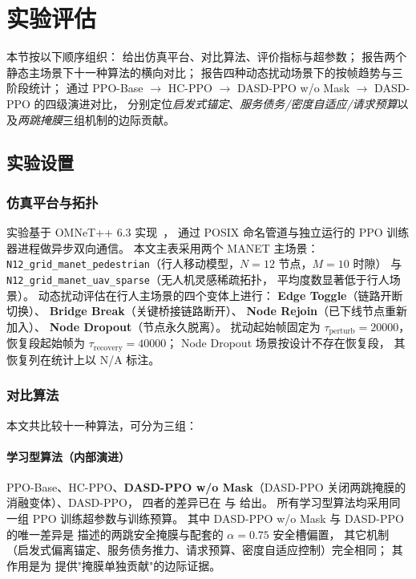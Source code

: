 \section{实验评估}
\label{sec:exp}

本节按以下顺序组织：
 给出仿真平台、对比算法、评价指标与超参数；
 报告两个静态主场景下十一种算法的横向对比；
 报告四种动态扰动场景下的按帧趋势与三阶段统计；
 通过 PPO-Base \(\rightarrow\) HC-PPO \(\rightarrow\) DASD-PPO w/o Mask \(\rightarrow\) DASD-PPO 的四级演进对比，
分别定位\emph{启发式锚定}、\emph{服务债务/密度自适应/请求预算}以及\emph{两跳掩膜}三组机制的边际贡献。

\subsection{实验设置}
\label{subsec:setup}

\subsubsection{仿真平台与拓扑}

实验基于 OMNeT++ 6.3 实现~\cite{omnetpp}，
通过 POSIX 命名管道与独立运行的 PPO 训练器进程做异步双向通信。
本文主表采用两个 MANET 主场景：
\texttt{N12\_grid\_manet\_pedestrian}（行人移动模型，\(N=12\) 节点，\(M=10\) 时隙）
与 \texttt{N12\_grid\_manet\_uav\_sparse}（无人机灵感稀疏拓扑，
平均度数显著低于行人场景）。
动态扰动评估在行人主场景的四个变体上进行：
\textbf{Edge Toggle}（链路开断切换）、
\textbf{Bridge Break}（关键桥接链路断开）、
\textbf{Node Rejoin}（已下线节点重新加入）、
\textbf{Node Dropout}（节点永久脱离）。
扰动起始帧固定为 \(\tau_{\mathrm{perturb}}=20000\)，
恢复段起始帧为 \(\tau_{\mathrm{recovery}}=40000\)；
Node Dropout 场景按设计不存在恢复段，
其恢复列在统计上以 N/A 标注。

\subsubsection{对比算法}

本文共比较十一种算法，可分为三组：

\paragraph{学习型算法（内部演进）}
PPO-Base、HC-PPO、\textbf{DASD-PPO w/o Mask}（DASD-PPO 关闭两跳掩膜的消融变体）、DASD-PPO，
四者的差异已在  与  给出。
所有学习型算法均采用同一组 PPO 训练超参数与训练预算。
其中 DASD-PPO w/o Mask 与 DASD-PPO 的唯一差异是  描述的两跳安全掩膜与配套的 \(\alpha=0.75\) 安全槽偏置，
其它机制（启发式偏离锚定、服务债务推力、请求预算、密度自适应控制）完全相同；
其作用是为  提供"掩膜单独贡献"的边际证据。

